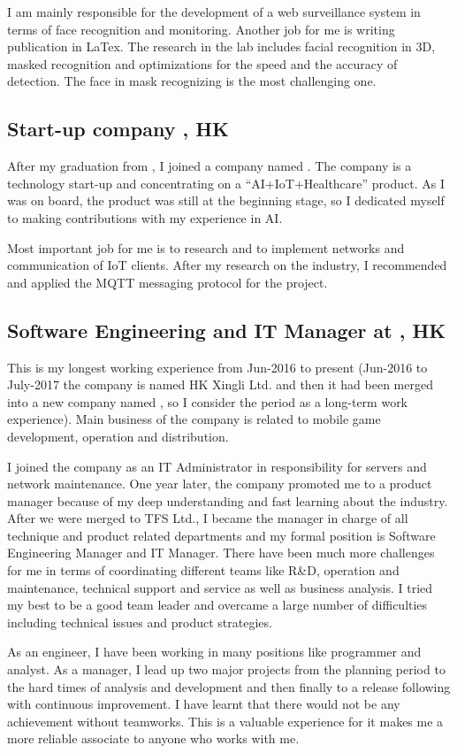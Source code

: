 I am mainly responsible for the development of a web surveillance system in terms of face recognition and monitoring. Another job for me is writing publication in LaTex. The research in the lab includes facial recognition in 3D, masked recognition and optimizations for the speed and the accuracy of detection. The face in mask recognizing is the most challenging one.


\subsection{Start-up company {\SGLong}, HK}
After my graduation from {\PolyUShort}, I joined a company named {\SGShort}. The company is a technology start-up and concentrating on a “AI+IoT+Healthcare” product. As I was on board, the product was still at the beginning stage, so I dedicated myself to making contributions with my experience in AI.

Most important job for me is to research and to implement networks and communication of IoT clients. After my research on the industry, I recommended and applied the MQTT messaging protocol for the project.


\subsection{Software Engineering and IT Manager at {\TFSLong}, HK}
This is my longest working experience from Jun-2016 to present (Jun-2016 to July-2017 the company is named HK Xingli Ltd. and then it had been merged into a new company named {\TFSShort}, so I consider the period as a long-term work experience). Main business of the company is related to mobile game development, operation and distribution.

I joined the company as an IT Administrator in responsibility for servers and network maintenance. One year later, the company promoted me to a product manager because of my deep understanding and fast learning about the industry. After we were merged to TFS Ltd., I became the manager in charge of all technique and product related departments and my formal position is Software Engineering Manager and IT Manager. There have been much more challenges for me in terms of coordinating different teams like R\&D, operation and maintenance, technical support and service as well as business analysis. I tried my best to be a good team leader and overcame a large number of difficulties including technical issues and product strategies.

As an engineer, I have been working in many positions like programmer and analyst. As a manager, I lead up two major projects from the planning period to the hard times of analysis and development and then finally to a release following with continuous improvement. I have learnt that there would not be any achievement without teamworks. This is a valuable experience for it makes me a more reliable associate to anyone who works with me.
